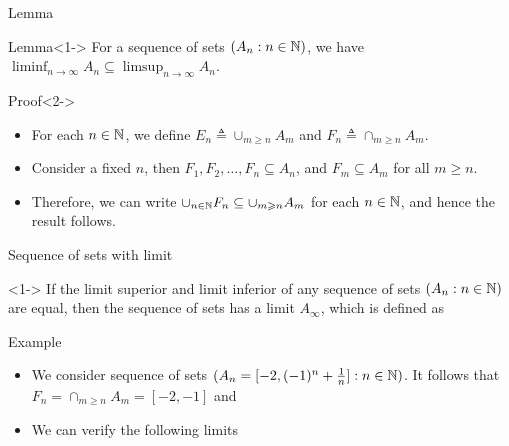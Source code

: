 \documentclass[12pt,aspectratio=169]{beamer}
\begin{document}
\begin{frame}{Lemma} 
    \begin{block}{Lemma}<1->
    For a sequence of sets $(A_n: n \in \mathbb{N})$, we have $\liminf_{n \to \infty}A_n \subseteq \limsup_{n \to \infty}A_n$.  
    \end{block}
    \begin{block}{Proof}<2->
    \begin{itemize}
        \item <3-> For each $n \in \mathbb{N}$, we define $E_n \triangleq \cup_{m \ge n}A_m$ and $F_n \triangleq \cap_{m \ge n}A_m$. 
        \item <4-> Consider a fixed $n$, then $F_1, F_2, \dots, F_n \subseteq A_n$, and $F_m \subseteq A_m$ for all $m \ge n$. 
        \item <5-> Therefore, we can write $\cup_{n \in \mathbb{N}}F_n \subseteq \cup_{m \geqslant n}A_m$ for each $n \in \mathbb{N}$, 
        and hence the result follows. 
    \end{itemize}
    \end{block}
\end{frame}


\begin{frame}{Sequence of sets with limit}
    \begin{Definition}<1->
        If the limit superior and limit inferior of any sequence of sets $(A_n: n \in \mathbb{N})$ are equal, then the sequence of sets has a limit $A_\infty$, which is defined as 
    \end{Definition}
\end{frame}

\begin{frame}{Example}
    \begin{Example}
    \begin{itemize}
        \item <1-> We consider sequence of sets $(A_n = [-2, (-1)^n + \frac{1}{n}]: n \in \mathbb{N})$. 
        It follows that  $F_n = \cap_{m \ge n}A_m = [-2, -1]$ and 
        \item <2-> We can verify the following limits 
    \end{itemize}
    \end{Example}
\end{frame}
\end{document}
